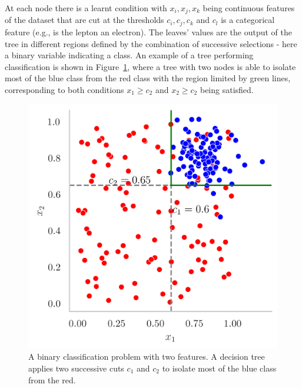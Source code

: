 At each node there is a learnt condition with $x_i, x_j, x_k$ being continuous features of the dataset that are cut at the thresholds $c_i, c_j, c_k$ and $c_l$ is a categorical feature (e.g., is the lepton an electron). The leaves' values are the output of the tree in different regions defined by the combination of successive selections - here a binary variable indicating a class. An example of a tree performing classification is shown in Figure~\ref{fig:tree-ex}, where a tree with two nodes is able to isolate most of the blue class from the red class with the region limited by green lines, corresponding to both conditions $x_1 \geq c_2$ and $x_2 \geq c_2$ being satisfied.

\begin{figure}[h!]
    \center
    \begin{minipage}[c]{0.3\textwidth}
        \caption{A binary classification problem with two features. A decision tree applies two successive cuts $c_1$ and $c_2$ to isolate most of the blue class from the red.}\label{fig:tree-ex}
      \end{minipage}
      \begin{minipage}[c]{0.5\textwidth}
        \includegraphics[width=\textwidth]{Images/ML/scatterPlot.png}
      \end{minipage}
\end{figure}
    
